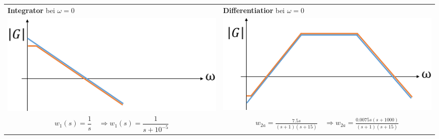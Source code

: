 \begin{tabularx}{\linewidth}{p{0.5\linewidth} p{0.5\linewidth}}
	\textbf{Integrator } bei $\omega=0$	&\textbf{Differentiatior} bei $\omega=0$		\\
	\includegraphics[width=.5\linewidth]{bilder/hinf12}&
	\includegraphics[width=.5\linewidth]{bilder/hinf11}\\
	\begin{equation*}
	w_1(s) =\frac{1}{s} \quad\Rightarrow w_1(s) = \frac{1}{s+10^{-5}}
	\end{equation*}&
	\begin{align*}
	w_{2a}=\frac{7.5s}{(s+1)(s+15)}\quad\Rightarrow w_{2a} = \frac{0.0075s(s+1000)}{(s+1)(s+15)}
	\end{align*}
\end{tabularx}


